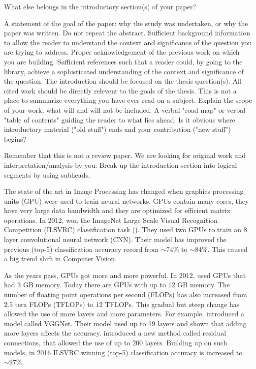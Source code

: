 What else belongs in the introductory section(s) of your paper? 

    A statement of the goal of the paper: why the study was undertaken, or why the paper was written. Do not repeat the abstract. 
    Sufficient background information to allow the reader to understand the context and significance of the question you are trying to address. 
    Proper acknowledgement of the previous work on which you are building. Sufficient references such that a reader could, by going to the library, achieve a sophisticated understanding of the context and significance of the question.
    The introduction should be focused on the thesis question(s).  All cited work should be directly relevent to the goals of the thesis.  This is not a place to summarize everything you have ever read on a subject.
    Explain the scope of your work, what will and will not be included. 
    A verbal "road map" or verbal "table of contents" guiding the reader to what lies ahead. 
    Is it obvious where introductory material ("old stuff") ends and your contribution ("new stuff") begins? 

Remember that this is not a review paper. We are looking for original work and interpretation/analysis by you. Break up the introduction section into logical segments by using subheads. 
\fi

The state of the art in Image Processing has changed when graphics processing units (GPU) were used to train neural networks. GPUs contain many cores, they have very large data bandwidth and they are optimized for efficient matrix operations. In 2012, \cite{krizhevsky2012imagenet} won the ImageNet Large Scale Visual Recognition Competition (ILSVRC) classification task (\cite{deng2012image}). They used two GPUs to train an 8 layer convolutional neural network (CNN). Their model has improved the previous (top-5) classification accuracy record from $\sim 74\%$ to $\sim 84\%$. This caused a big trend shift in Computer Vision. 

As the years pass, GPUs got more and more powerful. In 2012, \cite{krizhevsky2012imagenet} used GPUs that had 3 GB memory. Today there are GPUs with up to 12 GB memory. The number of floating point operations per second (FLOPs) has also increased from $2.5$ tera FLOPs (TFLOPs) to $12$ TFLOPs. This gradual but steep change has allowed the use of more layers and more parameters. For example, \cite{Simonyan:2014aa} introduced a model called VGGNet. Their model used up to 19 layers and shown that adding more layers affects the accuracy. \cite{He:2015aa} introduced a new method called residual connections, that allowed the use of up to 200 layers. Building up on such models, in 2016 ILSVRC winning (top-5) classification accuracy is increased to $\sim 97\%$. 

